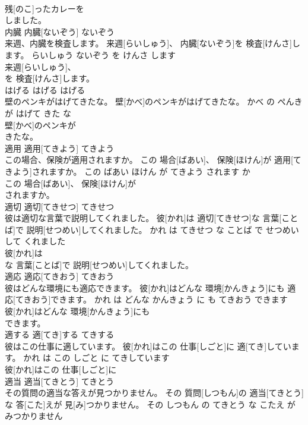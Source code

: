 \documentclass[8pt]{extreport}
\begin{document}
\begin{CJK}{UTF8}{min}
\\	残[のこ]ったカレーを
\\	しました。			
\\	内臓	内臓[ないぞう]	ないぞう	
\\	来週、内臓を検査します。	来週[らいしゅう]、 内臓[ないぞう]を 検査[けんさ]します。	らいしゅう ないぞう を けんさ します	
\\	来週[らいしゅう]、
\\	を 検査[けんさ]します。			
\\	はげる	はげる	はげる	
\\	壁のペンキがはげてきたな。	壁[かべ]のペンキがはげてきたな。	かべ の ぺんき が はげて きた な	
\\	壁[かべ]のペンキが
\\	きたな。			
\\	適用	適用[てきよう]	てきよう	
\\	この場合、保険が適用されますか。	この 場合[ばあい]、 保険[ほけん]が 適用[てきよう]されますか。	この ばあい ほけん が てきよう されます か	
\\	この 場合[ばあい]、 保険[ほけん]が
\\	されますか。			
\\	適切	適切[てきせつ]	てきせつ	
\\	彼は適切な言葉で説明してくれました。	彼[かれ]は 適切[てきせつ]な 言葉[ことば]で 説明[せつめい]してくれました。	かれ は てきせつ な ことば で せつめい して くれました	
\\	彼[かれ]は
\\	な 言葉[ことば]で 説明[せつめい]してくれました。			
\\	適応	適応[てきおう]	てきおう	
\\	彼はどんな環境にも適応できます。	彼[かれ]はどんな 環境[かんきょう]にも 適応[てきおう]できます。	かれ は どんな かんきょう に も てきおう できます	
\\	彼[かれ]はどんな 環境[かんきょう]にも
\\	できます。			
\\	適する	適[てき]する	てきする	
\\	彼はこの仕事に適しています。	彼[かれ]はこの 仕事[しごと]に 適[てき]しています。	かれ は この しごと に てきしています	
\\	彼[かれ]はこの 仕事[しごと]に
\\	適当	適当[てきとう]	てきとう	
\\	その質問の適当な答えが見つかりません。	その 質問[しつもん]の 適当[てきとう]な 答[こた]えが 見[み]つかりません。	その しつもん の てきとう な こたえ が みつかりません	

\end{CJK}
\end{document}
